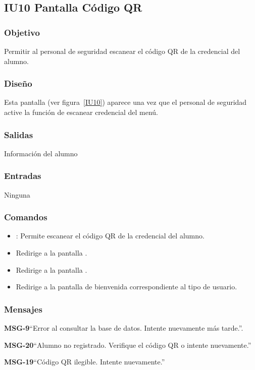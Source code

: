 \subsection{IU10 Pantalla Código QR}

\subsubsection{Objetivo}
Permitir al personal de seguridad escanear el código QR de la credencial del alumno.

\subsubsection{Diseño}
Esta pantalla  (ver figura~\ref{IU10}) aparece una vez que el personal de seguridad active la función de escanear credencial del menú. 


\subsubsection{Salidas}
Información del alumno

\subsubsection{Entradas}
Ninguna

\subsubsection{Comandos}
\begin{itemize}
	\item {}: Permite escanear el código QR de la credencial del alumno.
	\item {} Redirige a la pantalla .
    \item {} Redirige a la pantalla .
    \item {} Redirige a la pantalla de bienvenida correspondiente al tipo de usuario.
\end{itemize}

\subsubsection{Mensajes}

\begin{Citemize}
	\item {\bf MSG-9}{``Error al consultar la base de datos. Intente nuevamente más tarde.''}.
	\item {\bf MSG-20}{``Alumno no registrado. Verifique el código QR o intente nuevamente.''}
	\item {\bf MSG-19}{``Código QR ilegible. Intente nuevamente.''}
\end{Citemize}


